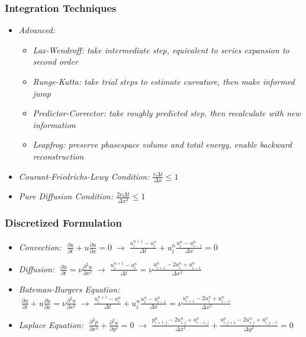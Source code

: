 	\begin{frame}[noframenumbering]
		\frametitle{Integration Techniques}
		\begin{itemize}
			\item<1-> \itshape{Advanced:}
			\begin{itemize}
				\item<2-> \itshape{Lax-Wendroff:} take intermediate step, equivalent to series expansion to second order
				\item<3-> \itshape{Runge-Kutta:} take trial steps to estimate curvature, then make informed jump
				\item<4-> \itshape{Predictor-Corrector:} take roughly predicted step, then recalculate with new information
				\item<5-> \itshape{Leapfrog:} preserve phasespace volume and total energy, enable backward reconstruction
			\end{itemize}
			\vspace{1ex}
			\item<6-> \itshape{Courant-Friedrichs-Lewy Condition:} $\displaystyle{\frac{v\Delta t}{\Delta x} \leq 1}$
			\item<8-> \itshape{Pure Diffusion Condition:} $\displaystyle{\frac{2\nu\Delta t}{\Delta x^2} \leq 1}$
		\end{itemize}
	\end{frame}

	\begin{frame}
		\frametitle{Discretized Formulation}
		\begin{itemize}
			\item<2-> \itshape{Convection:} $\displaystyle{\;\frac{\partial u}{\partial t} + u \frac{\partial u}{\partial x} = 0\;\longrightarrow\;
											 \frac{u_i^{n+1} - u_i^n}{\Delta t} + u_i^n \frac{u_i^n - u_{i-1}^n}{\Delta x} = 0}$
			\item<3-> \itshape{Diffusion:} $\displaystyle{\;\frac{\partial u}{\partial t} = \nu\frac{\partial^2 u}{\partial x^2}\;\longrightarrow\;
											\frac{u_i^{n+1} - u_i^n}{\Delta t} = \nu\frac{u_{i+1}^n - 2u_i^n + u_{i-1}^n}{\Delta x^2}}$
			\item<4-> \itshape{Bateman-Burgers Equation:} $\displaystyle{\; \frac{\partial u}{\partial t} + u \frac{\partial u}{\partial x} =
														   \nu\frac{\partial^2 u}{\partial x^2}\;\longrightarrow\;
														   \frac{u_i^{n+1} - u_i^n}{\Delta t} + u_i^n \frac{u_i^n - u_{i-1}^n}{\Delta x} =
														   \nu\frac{u_{i+1}^n - 2u_i^n + u_{i-1}^n}{\Delta x^2}}$
			\item<5-> \itshape{Laplace Equation:} $\displaystyle{\;\frac{\partial^2 p}{\partial x^2} + \frac{\partial^2 u}{\partial y^2} = 0\;
												   \longrightarrow\; \frac{p_{i+1, j}^n - 2u_{i, j}^n + u_{i-1, j}^n}{\Delta x^2} +
												   \frac{u_{i, j+1}^n - 2u_{i, j}^n + u_{i, j-1}^n}{\Delta y^2} = 0}$
		\end{itemize}
	\end{frame}

